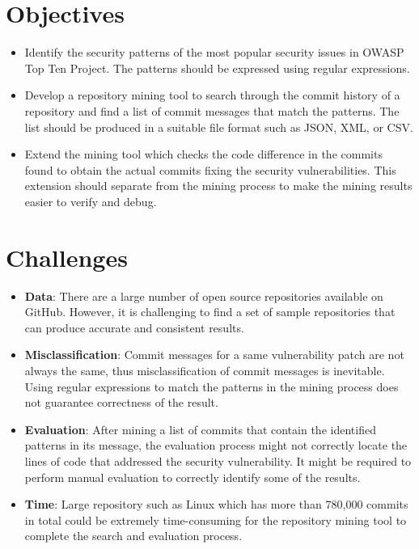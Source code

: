 \documentclass[12pt, a4paper]{report}
\begin{document}
\section{Objectives}
\label{sec:objectives}
\begin{itemize}
	\item Identify the security patterns of the most popular security issues in OWASP Top Ten Project.
	The patterns should be expressed using regular expressions.
	\item Develop a repository mining tool to search through the commit history of a repository and
	find a list of commit messages that match the patterns. The list should be produced in a suitable
	file format such as JSON, XML, or CSV.
	\item Extend the mining tool which checks the code difference in the commits found to obtain the
	actual commits fixing the security vulnerabilities. This extension should separate from the mining
	process to make the mining results easier to verify and debug.
\end{itemize}

\section{Challenges}
\label{sec:challenges}
\begin{itemize}
	\item \textbf{Data}: There are a large number of open source repositories available on GitHub.
	However, it is challenging to find a set of sample repositories that can produce accurate and
	consistent results.
	\item \textbf{Misclassification}: Commit messages for a same vulnerability patch are not always
	the same, thus misclassification of commit messages is inevitable. Using regular expressions to
	match the patterns in the mining process does not guarantee correctness of the result.
	\item \textbf{Evaluation}: After mining a list of commits that contain the identified patterns in
	its message, the evaluation process might not correctly locate the lines of code that addressed
	the security vulnerability. It might be required to perform manual evaluation to correctly
	identify some of the results.
	\item \textbf{Time}: Large repository such as Linux which has more than 780,000 commits in total
	\cite{linux_repo} could be extremely time-consuming for the repository mining tool to complete the
	search and evaluation process.
\end{itemize}
\end{document}
